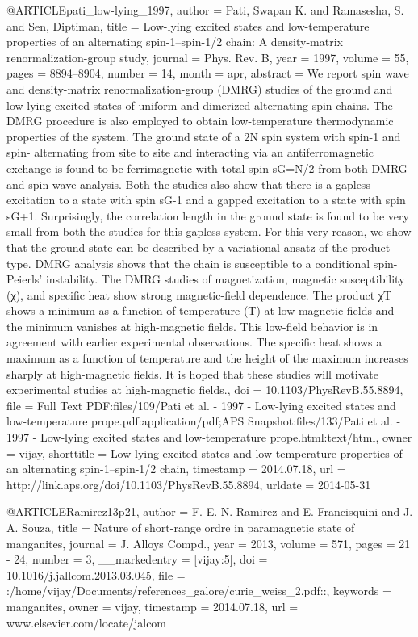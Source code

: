 @ARTICLE{pati_low-lying_1997,
  author = {Pati, Swapan K. and Ramasesha, S. and Sen, Diptiman},
  title = {Low-lying excited states and low-temperature properties of an alternating
	spin-1–spin-1/2 chain: A density-matrix renormalization-group study},
  journal = {Phys. Rev. B},
  year = {1997},
  volume = {55},
  pages = {8894--8904},
  number = {14},
  month = apr,
  abstract = {We report spin wave and density-matrix renormalization-group ({DMRG)}
	studies of the ground and low-lying excited states of uniform and
	dimerized alternating spin chains. The {DMRG} procedure is also employed
	to obtain low-temperature thermodynamic properties of the system.
	The ground state of a {2N} spin system with spin-1 and spin- alternating
	from site to site and interacting via an antiferromagnetic exchange
	is found to be ferrimagnetic with total spin {sG=N/2} from both {DMRG}
	and spin wave analysis. Both the studies also show that there is
	a gapless excitation to a state with spin {sG-1} and a gapped excitation
	to a state with spin {sG+1.} Surprisingly, the correlation length
	in the ground state is found to be very small from both the studies
	for this gapless system. For this very reason, we show that the ground
	state can be described by a variational ansatz of the product type.
	{DMRG} analysis shows that the chain is susceptible to a conditional
	spin-Peierls' instability. The {DMRG} studies of magnetization, magnetic
	susceptibility (χ), and specific heat show strong magnetic-field
	dependence. The product {χT} shows a minimum as a function of temperature
	(T) at low-magnetic fields and the minimum vanishes at high-magnetic
	fields. This low-field behavior is in agreement with earlier experimental
	observations. The specific heat shows a maximum as a function of
	temperature and the height of the maximum increases sharply at high-magnetic
	fields. It is hoped that these studies will motivate experimental
	studies at high-magnetic fields.},
  doi = {10.1103/PhysRevB.55.8894},
  file = {Full Text PDF:files/109/Pati et al. - 1997 - Low-lying excited states and low-temperature prope.pdf:application/pdf;APS Snapshot:files/133/Pati et al. - 1997 - Low-lying excited states and low-temperature prope.html:text/html},
  owner = {vijay},
  shorttitle = {Low-lying excited states and low-temperature properties of an alternating
	spin-1–spin-1/2 chain},
  timestamp = {2014.07.18},
  url = {http://link.aps.org/doi/10.1103/PhysRevB.55.8894},
  urldate = {2014-05-31}
}

@ARTICLE{Ramirez13p21,
  author = {F. E. N. Ramirez and E. Francisquini and J. A. Souza},
  title = {Nature of short-range ordre in paramagnetic state of manganites},
  journal = {J. Alloys Compd.},
  year = {2013},
  volume = {571},
  pages = {21 - 24},
  number = {3},
  __markedentry = {[vijay:5]},
  doi = {10.1016/j.jallcom.2013.03.045},
  file = {:/home/vijay/Documents/references_galore/curie_weiss_2.pdf::},
  keywords = {manganites},
  owner = {vijay},
  timestamp = {2014.07.18},
  url = {www.elsevier.com/locate/jalcom}
}

